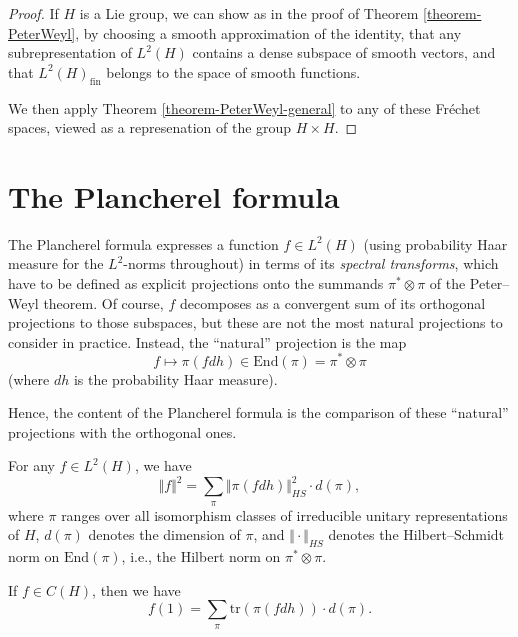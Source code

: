 \begin{proof}
If $H$ is a Lie group, we can show as in the proof of Theorem \ref{theorem-PeterWeyl}, by choosing a smooth approximation of the identity, that any subrepresentation of $L^2(H)$ contains a dense subspace of smooth vectors, and that $L^2(H)_{\text{fin}}$ belongs to the space of smooth functions. 


We then apply Theorem \ref{theorem-PeterWeyl-general} to any of these Fr\'echet spaces, viewed as a represenation of the group $H\times H$. 


 
\end{proof}



\section{The Plancherel formula}
\label{section-Plancherel}

The Plancherel formula expresses a function $f\in L^2(H)$ (using probability Haar measure for the $L^2$-norms throughout) in terms of its \emph{spectral transforms}, which have to be defined as explicit projections onto the summands $\pi^*\otimes \pi$ of the Peter--Weyl theorem. Of course, $f$ decomposes as a convergent sum of its orthogonal projections to those subspaces, but these are not the most natural projections to consider in practice. Instead, the ``natural'' projection is the map
$$ f\mapsto \pi(f dh) \in \text{End}(\pi) = \pi^*\otimes \pi$$
(where $dh$ is the probability Haar measure). 

Hence, the content of the Plancherel formula is the comparison of these ``natural'' projections with the orthogonal ones.

\begin{theorem}
 \label{theorem-Plancherel}
For any $f\in L^2(H)$, we have 
\begin{equation}
 \label{equation-Plancherelformula}
\Vert f\Vert^2 = \sum_\pi \Vert \pi(fdh) \Vert_{HS}^2 \cdot d(\pi),
\end{equation}
 where $\pi$ ranges over all isomorphism classes of irreducible unitary representations of $H$, $d(\pi)$ denotes the dimension of $\pi$, and $\Vert \cdot \Vert_{HS}$ denotes the Hilbert--Schmidt norm on $\text{End}(\pi)$, i.e., the Hilbert norm on $\pi^*\otimes \pi$.
 
 If $f\in C(H)$, then we have 
\begin{equation}
 \label{equation-Plancherelformula-trace}
f(1) = \sum_\pi \text{tr}\left( \pi(fdh) \right) \cdot d(\pi).
\end{equation}
\end{theorem}

